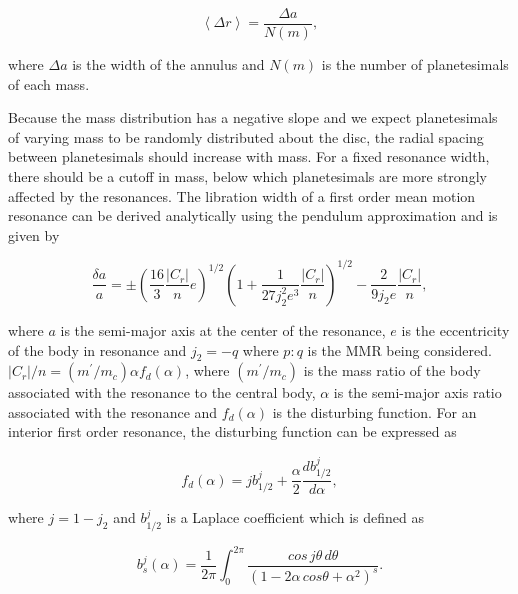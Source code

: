 \begin{equation}\label{eq:spacing}
\left< \Delta r \right> = \frac{\Delta a}{N(m)},
\end{equation}

\noindent where $\Delta a$ is the width of the annulus and $N(m)$ is the number of planetesimals of each mass.

Because the mass distribution has a negative slope and we expect planetesimals of varying mass to be randomly distributed 
about the disc, the radial spacing between planetesimals should increase with mass. For a fixed resonance width, there should 
be a cutoff in mass, below which planetesimals are more strongly affected by the resonances. The libration width of a first order 
mean motion resonance can be derived analytically using the pendulum approximation \cite{murray00} and is given by

\begin{equation}\label{eq:lib_width}
\frac{\delta a}{a} = \pm \left(\frac{16}{3} \frac{\left| C_{r} \right|}{n} e \right)^{1/2} \left(  1 + \frac{1}{27 j_{2}^2 e^3} \frac{\left| C_{r} \right|}{n} \right)^{1/2} - \frac{2}{9 j_{2} e}  \frac{\left| C_{r} \right|}{n},
\end{equation}

\noindent where $a$ is the semi-major axis at the center of the resonance, $e$ is the eccentricity of the body in resonance and 
$j_2 = -q$ where $p:q$ is the MMR being considered. $\left| C_{r} \right|/n = (m^{\prime}/m_{c}) \alpha f_{d}(\alpha)$, where $
(m^{\prime}/m_{c})$ is the mass ratio of the body associated with the resonance to the central body, $\alpha$ is the semi-major 
axis ratio associated with the resonance and $f_{d}(\alpha)$ is the disturbing function. For an interior first order resonance, the 
disturbing function can be expressed as

\begin{equation}\label{eq:dist}
f_{d}(\alpha) = j b_{1/2}^{j} + \frac{\alpha}{2}\frac{d b_{1/2}^{j}}{d \alpha},
\end{equation}

\noindent \cite{winter97} where $j = 1 - j_{2}$ and $b_{1/2}^{j}$ is a Laplace coefficient which is defined as

\begin{equation}\label{eq:lap}
b_{s}^{j}(\alpha) = \frac{1}{2 \pi} \int_{0}^{2 \pi} \frac{cos \, j \theta \, d \theta}{\left( 1 - 2 \alpha \, cos \theta + \alpha^2 \right)^{s}}.
\end{equation}


